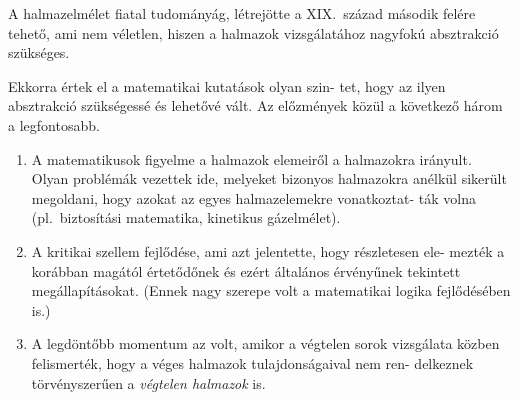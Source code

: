 \documentclass[a4paper,12pt]{article}
\begin{document}
A halmazelmélet fiatal tudományág, létrejötte a XIX.~század második
felére tehető, ami nem véletlen, hiszen a halmazok vizsgálatához nagyfokú
absztrakció szükséges.

Ekkorra értek el a matematikai kutatások olyan szin-
tet, hogy az ilyen absztrakció szükségessé és lehetővé vált. Az előzmények
közül a következő három a legfontosabb.

\begin{enumerate}
\item A matematikusok figyelme a halmazok elemeiről a halmazokra irányult.
Olyan problémák vezettek ide, melyeket bizonyos halmazokra anélkül
sikerült megoldani, hogy azokat az egyes halmazelemekre vonatkoztat-
ták volna (pl.~biztosítási matematika, kinetikus gázelmélet).

\item A kritikai szellem fejlődése, ami azt jelentette, hogy részletesen ele-
mezték a korábban magától értetődőnek és ezért általános érvényűnek
tekintett megállapításokat. (Ennek nagy szerepe volt a matematikai
logika fejlődésében is.)

\item A legdöntőbb momentum az volt, amikor a végtelen sorok vizsgálata
közben felismerték, hogy a véges halmazok tulajdonságaival nem ren-
delkeznek törvényszerűen a \emph{végtelen halmazok} is.
\end{enumerate}
\end{document}
